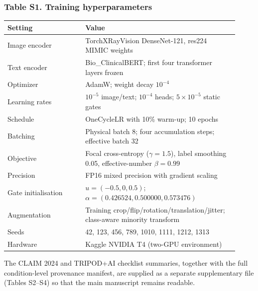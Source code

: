 \subsubsection*{Table S1. Training hyperparameters}
\begin{center}
\scriptsize
\begin{tabular}{p{0.31\linewidth}p{0.61\linewidth}}
\toprule
Setting & Value \\
\midrule
Image encoder & TorchXRayVision DenseNet-121, res224 MIMIC weights \\
Text encoder & Bio\_ClinicalBERT; first four transformer layers frozen \\
Optimizer & AdamW; weight decay $10^{-4}$ \\
Learning rates & $10^{-5}$ image/text; $10^{-4}$ heads; $5\times10^{-5}$ static gates \\
Schedule & OneCycleLR with 10\% warm-up; 10 epochs \\
Batching & Physical batch 8; four accumulation steps; effective batch 32 \\
Objective & Focal cross-entropy ($\gamma=1.5$), label smoothing 0.05, effective-number $\beta=0.99$ \\
Precision & FP16 mixed precision with gradient scaling \\
Gate initialisation & $u=(-0.5,0,0.5)$; $\alpha=(0.426524,0.500000,0.573476)$ \\
Augmentation & Training crop/flip/rotation/translation/jitter; class-aware minority transform \\
Seeds & 42, 123, 456, 789, 1010, 1111, 1212, 1313 \\
Hardware & Kaggle NVIDIA T4 (two-GPU environment) \\
\bottomrule
\end{tabular}
\end{center}
\medskip
The CLAIM 2024 and TRIPOD+AI checklist summaries, together with the full
condition-level provenance manifest, are supplied as a separate supplementary
file (Tables S2--S4) so that the main manuscript remains readable.
